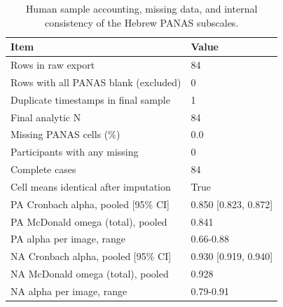 \begin{table}
\caption{Human sample accounting, missing data, and internal consistency of the Hebrew PANAS subscales.}
\begin{tabular}{ll}
\toprule
Item & Value \\
\midrule
Rows in raw export & 84 \\
Rows with all PANAS blank (excluded) & 0 \\
Duplicate timestamps in final sample & 1 \\
Final analytic N & 84 \\
Missing PANAS cells (\%) & 0.0 \\
Participants with any missing & 0 \\
Complete cases & 84 \\
Cell means identical after imputation & True \\
PA Cronbach alpha, pooled [95\% CI] & 0.850 [0.823, 0.872] \\
PA McDonald omega (total), pooled & 0.841 \\
PA alpha per image, range & 0.66-0.88 \\
NA Cronbach alpha, pooled [95\% CI] & 0.930 [0.919, 0.940] \\
NA McDonald omega (total), pooled & 0.928 \\
NA alpha per image, range & 0.79-0.91 \\
\bottomrule
\end{tabular}
\end{table}
